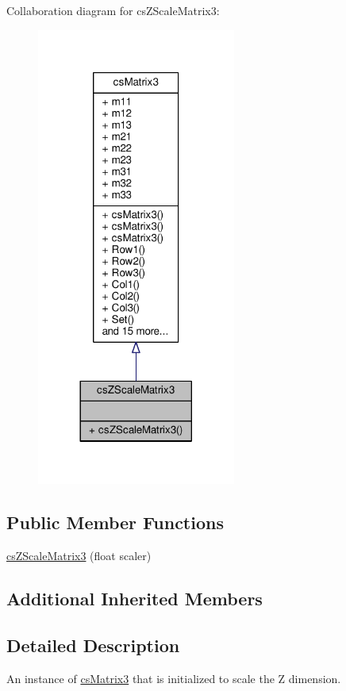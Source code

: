 Collaboration diagram for cs\+Z\+Scale\+Matrix3\+:
\nopagebreak
\begin{figure}[H]
\begin{center}
\leavevmode
\includegraphics[width=185pt]{d6/df5/classcsZScaleMatrix3__coll__graph}
\end{center}
\end{figure}
\subsection*{Public Member Functions}
\begin{DoxyCompactItemize}
\item 
\hyperlink{classcsZScaleMatrix3_a21203eff67eaabd5154fdcbeed0d18ad}{cs\+Z\+Scale\+Matrix3} (float scaler)
\end{DoxyCompactItemize}
\subsection*{Additional Inherited Members}


\subsection{Detailed Description}
An instance of \hyperlink{classcsMatrix3}{cs\+Matrix3} that is initialized to scale the Z dimension. 


